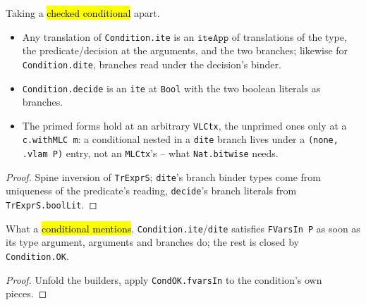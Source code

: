 \begin{lemma}
  \label{prim-cond:family:condition-tr-inv}
  \leanok

   Taking a \hl{checked conditional} apart.
  \begin{itemize}
  \item Any translation of \texttt{Condition.ite} is an $\mathtt{iteApp}$ of translations of the
    type, the predicate/decision at the arguments, and the two branches; likewise for
    \texttt{Condition.dite}, branches read under the decision's binder.
  \item \texttt{Condition.decide} is an \texttt{ite} at \texttt{Bool} with the two boolean literals
    as branches.
  \item {} The primed forms hold at an arbitrary \texttt{VLCtx}, the unprimed ones only
    at a \texttt{c.withMLC m}: a conditional nested in a \texttt{dite} branch lives under a
    \texttt{(none, .vlam P)} entry, not an \texttt{MLCtx}'s -- what \texttt{Nat.bitwise} needs.
  \end{itemize}
\end{lemma}
\begin{proof}
  \leanok
   Spine inversion of \texttt{TrExprS}; \texttt{dite}'s branch binder types come from
  uniqueness of the predicate's reading, \texttt{decide}'s branch literals from
  \texttt{TrExprS.boolLit}.
\end{proof}

\begin{lemma}
  \label{prim-cond:family:condition-fvarsin}
  \leanok

   What a \hl{conditional mentions}.
  \texttt{Condition.ite}/\texttt{dite} satisfies \texttt{FVarsIn P} as soon as its type argument,
  arguments and branches do; the rest is closed by \texttt{Condition.OK}.
\end{lemma}
\begin{proof}
  \leanok
   Unfold the builders, apply \texttt{CondOK.fvarsIn} to the condition's own pieces.
\end{proof}

